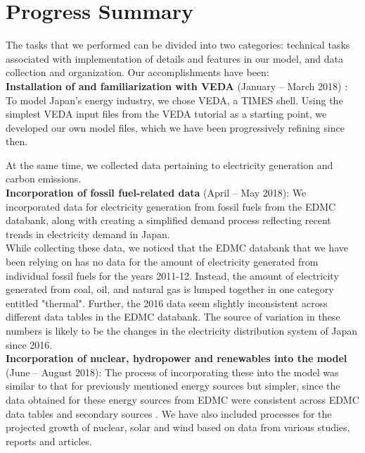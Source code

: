 \documentclass[14pt,a4paper]{article} %
\begin{document}
\section{Progress Summary}

The tasks that we performed can be divided into two categories: technical tasks associated with implementation of details and features in our model, and data collection and organization. Our accomplishments have been:\\

\textbf{Installation of and familiarization with VEDA} (January – March 2018) : To model Japan's energy industry, we chose VEDA, a \gls{TIMES} \cite{loulou_documentation_2005,gargiulo_documentation_2005} shell. Using the simplest VEDA input files from the VEDA tutorial \cite{gargiulo_documentation_2005} as a starting point, we developed our own model files, which we have been progressively refining since then.

At the same time, we collected data pertaining to electricity generation and carbon emissions.\\

\textbf{Incorporation of fossil fuel-related data} (April – May 2018): We incorporated data for electricity generation from fossil fuels from the \gls{EDMC} databank\cite{noauthor_energy_2018}, along with creating a simplified demand process reflecting recent trends in electricity demand in Japan. \\

While collecting these data, we noticed that the \gls{EDMC} databank that we have been relying on has no data for the amount of electricity generated from individual fossil fuels for the years 2011-12. Instead, the amount of electricity generated from coal, oil, and natural gas is lumped together in one category entitled "thermal". Further, the 2016 data seem slightly inconsistent across different data tables in the \gls{EDMC} databank. The source of variation in these numbers is likely to be the changes in the electricity distribution system of Japan since 2016.\\

\textbf{Incorporation of nuclear, hydropower and renewables into the model} (June – August 2018): The process of incorporating these into the model was similar to that for previously mentioned energy sources but simpler, since the data obtained for these energy sources from \gls{EDMC} were consistent across \gls{EDMC} data tables and secondary sources \cite{noauthor_energy_2018,noauthor_iea_2017, noauthor_japan_2017}. We have also included processes for the projected growth of nuclear, solar and wind based on data from various studies, reports and articles. \cite{publicover_japan_2017, dincer_analysis_2011,noauthor_geothermal_2018,heger_wind_2016,noauthor_operational_2013,noauthor_electricity_2017}\\
\end{document}
